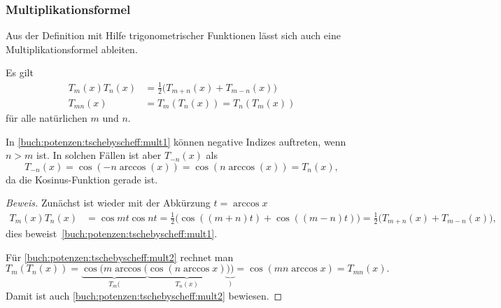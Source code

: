 \subsubsection{Multiplikationsformel}
Aus der Definition mit Hilfe trigonometrischer Funktionen
lässt sich auch eine Multiplikationsformel ableiten.

\begin{satz}
Es gilt
\begin{align}
T_m(x)T_n(x)&=\frac12\bigl(T_{m+n}(x) + T_{m-n}(x)\bigr)
\label{buch:potenzen:tschebyscheff:mult1}
\\
T_{mn}(x) &= T_m(T_n(x)) = T_n(T_m(x))
\label{buch:potenzen:tschebyscheff:mult2}
\end{align}
für alle natürlichen $m$ und $n$.
\end{satz}

In \eqref{buch:potenzen:tschebyscheff:mult1} können negative Indizes
auftreten, wenn $n>m$ ist.
In solchen Fällen ist aber $T_{-n}(x)$ als
\[
T_{-n}(x)
=
\cos(-n\arccos(x))
=
\cos(n\arccos(x))
=
T_n(x),
\]
da die Kosinus-Funktion gerade ist.

\begin{proof}[Beweis]
Zunächst ist wieder mit der Abkürzung $t=\arccos x$
\begin{align*}
T_m(x)T_n(x)
&=
\cos mt \cos nt
=
\frac12\bigl(\cos((m+n)t)+\cos((m-n)t)\bigr)
=
\frac12\bigl(
T_{m+n}(x) + T_{m-n}(x)
\bigr),
\end{align*}
dies beweist~\eqref{buch:potenzen:tschebyscheff:mult1}.

Für \eqref{buch:potenzen:tschebyscheff:mult2} rechnet man
\[
T_m(T_n(x))
=
\underbrace{\cos(m\arccos(}_{\displaystyle T_m(}\underbrace{\cos(n\arccos x)}_{\displaystyle T_n(x)}\underbrace{))}_{\displaystyle)}
=
\cos(mn\arccos x)
=
T_{mn}(x).
\]
Damit ist auch \eqref{buch:potenzen:tschebyscheff:mult2} bewiesen.
\end{proof}


